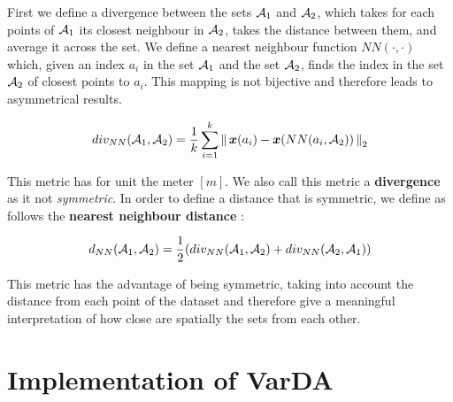 First we define a divergence between the sets $\mathcal{A}_1$ and $\mathcal{A}_2$, which takes for each points of $\mathcal{A}_1$ its closest neighbour in $\mathcal{A}_2$, takes the distance between them, and average it across the set. We define a nearest neighbour function $NN(\cdot,\cdot)$ which, given an index $a_i$ in the set $\mathcal{A}_1$ and the set $\mathcal{A}_2$, finds the index in the set $\mathcal{A}_2$ of closest points to $a_i$. This mapping is not bijective and therefore leads to asymmetrical results. 

\begin{equation}
	div_{NN}(\mathcal{A}_1,\mathcal{A}_2) = \frac{1}{k}\sum_{i=1}^k \left \lVert \,{\boldsymbol{{x}}}(a_i) - {\boldsymbol{{x}}}(NN(a_i,\mathcal{A}_2))\, \right \rVert_2
\end{equation}

This metric has for unit the meter $[m]$. We also call this metric a \textbf{divergence} as it not \textit{symmetric}. In order to define a distance that is symmetric, we define as follows the \textbf{nearest neighbour distance} :

\begin{equation}
	d_{NN}(\mathcal{A}_1,\mathcal{A}_2) = \frac{1}{2} (div_{NN}(\mathcal{A}_1,\mathcal{A}_2) + div_{NN}(\mathcal{A}_2,\mathcal{A}_1))
	\label{equ:distNN}
\end{equation}

This metric has the advantage of being symmetric, taking into account the distance from each point of the dataset and therefore give a meaningful interpretation of how close are spatially the sets from each other. 
%





\section{Implementation of VarDA}




